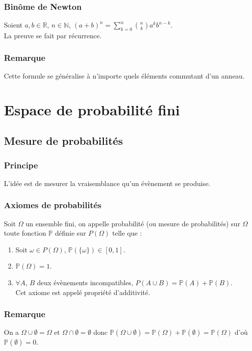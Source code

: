 \documentclass[a4paper,10pt]{book} %
\newcommand{\R}{\mathbb{R}}
\newcommand{\N}{\mathbb{N}}
\renewcommand{\P}{\mathbb{P}} %
\begin{document}
\subsubsection{Binôme de Newton}
Soient $a,b\in \R$, $n\in \N$, $\displaystyle (a+b)^n =\sum_{k=0}^n\binom{n}{k}a^kb^{n-k}$.\\

La preuve se fait par récurrence.

\subsubsection{Remarque}
Cette formule se généralise à n'importe quels éléments commutant d'un anneau.

\section{Espace de probabilité fini}
\subsection{Mesure de probabilités}
\subsubsection{Principe}
L'idée est de mesurer la vraisemblance qu'un évènement se produise.

\subsubsection{Axiomes de probabilités}
Soit $\Omega$ un ensemble fini, on appelle probabilité (ou mesure de probabilités) sur $\Omega$ toute fonction $\P$ définie sur $P(\Omega)$ telle que :
\begin{enumerate}
\item Soit $\omega\in P(\Omega)$, $\P(\{\omega\})\in [0,1]$.
\item $\P(\Omega)=1$.
\item $\forall A$, $B$ deux évènements incompatibles, $P(A\cup B)=\P(A)+\P(B)$.\\
Cet axiome est appelé propriété d'additivité.
\end{enumerate}

\subsubsection{Remarque}
On a $\Omega\cup \emptyset=\Omega$ et $\Omega\cap \emptyset=\emptyset$ donc $\P(\Omega\cup \emptyset)=\P(\Omega)+\P(\emptyset)=\P(\Omega)$ d'où  $\P(\emptyset)=0$.
\end{document}
